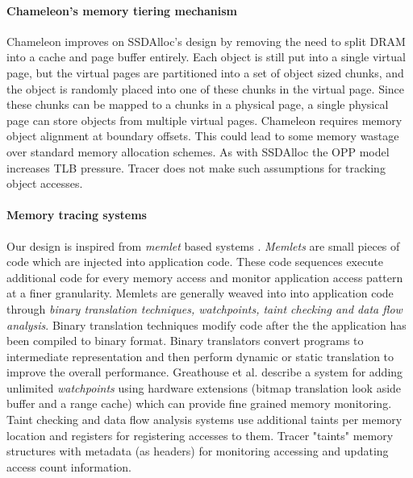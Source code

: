 \paragraph{Chameleon's memory tiering mechanism}
Chameleon improves on SSDAlloc's design by removing the need to split DRAM into a cache and page buffer entirely. Each object is still put into a single virtual page, but the virtual pages are partitioned into a set of object sized chunks, and the object is randomly placed into one of these chunks in the virtual page. Since these chunks can be mapped to a chunks in a physical page, a single physical page can store objects from multiple virtual pages. Chameleon requires memory object alignment at boundary offsets. This could lead to some memory wastage over standard memory allocation schemes. As with SSDAlloc the OPP model increases TLB pressure. Tracer does not make such assumptions for tracking object accesses.

\paragraph{Memory tracing systems}
Our design is inspired from {\emph{memlet}} based systems \cite{}. {\emph{Memlets}} are small pieces of code which are injected into application code. These code sequences execute additional code for every memory access and monitor application access pattern at  a finer granularity. Memlets are generally weaved into into application code through {\emph{binary translation techniques, watchpoints, taint checking and data flow analysis}}.
Binary translation techniques modify code after the the application has been compiled to binary format. Binary translators {\cite{nethercote2007valgrind,bellard2005qemu}}convert programs to intermediate representation and then perform dynamic or static translation to improve the overall performance. Greathouse et al. \cite{greathouse2012case} describe a system for adding unlimited {\emph{watchpoints}} using hardware extensions (bitmap translation look aside buffer and a range cache) which can provide fine grained memory monitoring. Taint checking \cite{newsome2005dynamic, ho2006practical} and data flow analysis systems use additional taints per memory location and registers for registering accesses to them. Tracer "taints" memory structures with metadata (as headers) for monitoring accessing and updating access count information.

\paragraph{}
